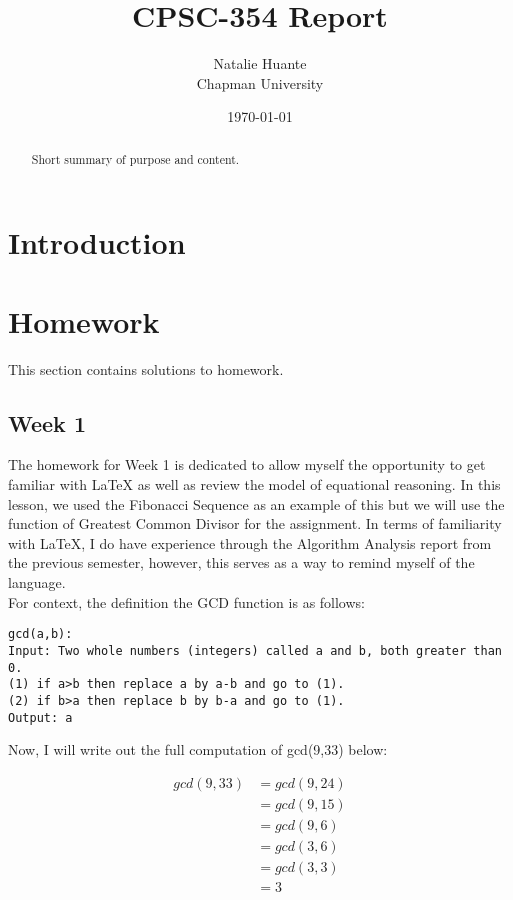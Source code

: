 \documentclass{article}
\title{CPSC-354 Report}
\author{Natalie Huante  \\ Chapman University}
\date{\today}
\theoremstyle{theorem}
\theoremstyle{definition}
\theoremstyle{remark}
\begin{document}
\maketitle

\begin{abstract}
Short  summary of purpose and content.  
\end{abstract}

\tableofcontents

\section{Introduction}\label{intro}

\section{Homework}\label{homework}

This section contains solutions to homework. 

\subsection{Week 1}

The homework for Week 1 is dedicated to allow myself the opportunity to get familiar with LaTeX as well as review the model of equational reasoning. 
In this lesson, we used the Fibonacci Sequence as an example of this but we will use the function of Greatest Common Divisor for the assignment.
In terms of familiarity with LaTeX, I do have experience through the Algorithm Analysis report from the previous 
semester, however, this serves as a way to remind myself of the language. \\


For context, the definition the GCD function is as follows:
\begin{verbatim}
gcd(a,b): 
Input: Two whole numbers (integers) called a and b, both greater than 0.
(1) if a>b then replace a by a-b and go to (1).
(2) if b>a then replace b by b-a and go to (1).
Output: a
\end{verbatim}

Now, I will write out the full computation of gcd(9,33) below:

\begin{align*}
  gcd(9,33) & = gcd(9,24)\\
            & = gcd(9,15)\\
            & = gcd(9,6)\\
            & = gcd(3,6)\\
            & = gcd(3,3)\\
            & = 3
\end{align*}
\end{document}
